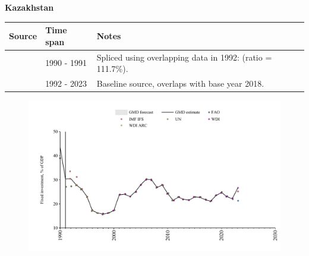 \documentclass[12pt,a4paper,landscape]{article}
\begin{document}
\begin{adjustbox}{max totalsize={\paperwidth}{\paperheight},center}
\begin{minipage}[t][\textheight][t]{\textwidth}
\vspace*{0.5cm}
{}
\begin{center}
{\Large\bfseries Kazakhstan}
\end{center}
\vspace{0.5cm}
\begin{table}[H]
\centering
\small
\begin{tabular}{|l|l|l|}
\hline
\textbf{Source} & \textbf{Time span} & \textbf{Notes} \\
\hline
\rowcolor{white}\cite{UN}& 1990 - 1991 &Spliced using overlapping data in 1992: (ratio = 111.7\%).\\
\rowcolor{lightgray}\cite{WDI}& 1992 - 2023 &Baseline source, overlaps with base year 2018.\\
\hline
\end{tabular}
\end{table}
\begin{figure}[H]
\centering
\includegraphics[width=\textwidth,height=0.6\textheight,keepaspectratio]{graphs/KAZ_finv_GDP.pdf}
\end{figure}
\end{minipage}
\end{adjustbox}
\end{document}
